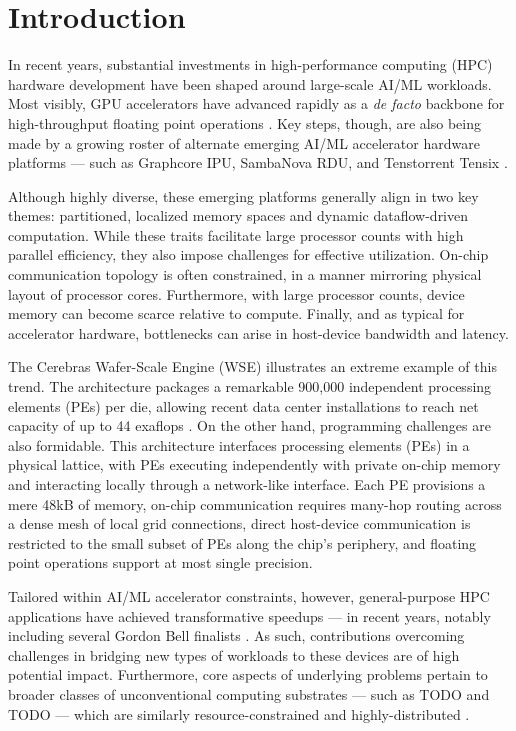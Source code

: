 \section{Introduction} \label{sec:introduction}

In recent years, substantial investments in high-performance computing (HPC) hardware development have been shaped around large-scale AI/ML workloads.
Most visibly, GPU accelerators have advanced rapidly as a \textit{de facto} backbone for high-throughput floating point operations \citep{unat2024landscape}.
Key steps, though, are also being made by a growing roster of alternate emerging AI/ML accelerator hardware platforms --- such as Graphcore IPU, SambaNova RDU, and Tenstorrent Tensix \citep{jia2019dissecting,lauterbach2021path,lie2022cerebras,zhang2016cambricon,emani2021accelerating,medina2020habana,Vasiljevic2021}.

Although highly diverse, these emerging platforms generally align in two key themes: partitioned, localized memory spaces and dynamic dataflow-driven computation.
While these traits facilitate large processor counts with high parallel efficiency, they also impose challenges for effective utilization.
On-chip communication topology is often constrained, in a manner mirroring physical layout of processor cores.
Furthermore, with large processor counts, device memory can become scarce relative to compute.
Finally, and as typical for accelerator hardware, bottlenecks can arise in host-device bandwidth and latency.

The Cerebras Wafer-Scale Engine (WSE) illustrates an extreme example of this trend.
The architecture packages a remarkable 900,000 independent processing elements (PEs) per die, allowing recent data center installations to reach net capacity of up to 44 exaflops \citep{lauterbach2021path,Feldman2025CerebrasOKC}.
On the other hand, programming challenges are also formidable.
This architecture interfaces processing elements (PEs) in a physical lattice, with PEs executing independently with private on-chip memory and interacting locally through a network-like interface.
Each PE provisions a mere 48kB of memory, on-chip communication requires many-hop routing across a dense mesh of local grid connections, direct host-device communication is restricted to the small subset of PEs along the chip's periphery, and floating point operations support at most single precision.

Tailored within AI/ML accelerator constraints, however, general-purpose HPC applications have achieved transformative speedups \citep{TODO} --- in recent years, notably including several Gordon Bell finalists \citep{TODO}.
As such, contributions overcoming challenges in bridging new types of workloads to these devices are of high potential impact.
Furthermore, core aspects of underlying problems pertain to broader classes of unconventional computing substrates --- such as TODO and TODO --- which are similarly resource-constrained and highly-distributed \citep{TODO}.

